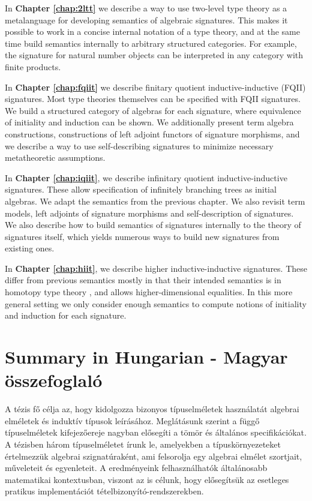 \documentclass[12pt,a4paper,twoside,openany]{book}
\theoremstyle{remark}
\theoremstyle{definition}
\theoremstyle{theorem}
\begin{document}
In \textbf{Chapter \ref{chap:2ltt}} we describe a way to use
two-level type theory \cite{twolevel} as a metalanguage for developing semantics
of algebraic signatures. This makes it possible to work in a concise internal
notation of a type theory, and at the same time build semantics internally to
arbitrary structured categories. For example, the signature for natural number
objects can be interpreted in any category with finite products.

In \textbf{Chapter \ref{chap:fqiit}} we describe finitary quotient
inductive-inductive (FQII) signatures. Most type theories themselves can be
specified with FQII signatures. We build a structured category of algebras for
each signature, where equivalence of initiality and induction can be shown. We
additionally present term algebra constructions, constructions of left adjoint
functors of signature morphisms, and we describe a way to use self-describing
signatures to minimize necessary metatheoretic assumptions.

In \textbf{Chapter \ref{chap:iqiit}}, we describe infinitary quotient
inductive-inductive signatures. These allow specification of infinitely
branching trees as initial algebras. We adapt the semantics from the previous
chapter. We also revisit term models, left adjoints of signature morphisms and
self-description of signatures. We also describe how to build semantics of
signatures internally to the theory of signatures itself, which yields numerous
ways to build new signatures from existing ones.

In \textbf{Chapter \ref{chap:hiit}}, we describe higher inductive-inductive
signatures. These differ from previous semantics mostly in that their intended
semantics is in homotopy type theory \cite{hottbook}, and allows
higher-dimensional equalities. In this more general setting we only consider
enough semantics to compute notions of initiality and induction for each signature.

\pagebreak
\section*{Summary in Hungarian - Magyar összefoglaló}

A tézis fő célja az, hogy kidolgozza bizonyos típuselméletek használatát
algebrai elméletek és induktív típusok leírásához. Meglátásunk szerint a függő
típuselméletek kifejezőereje nagyban elősegíti a tömör és általános
specifikációkat. A tézisben három típuselméletet írunk le, amelyekben a
típuskörnyezeteket értelmezzük algebrai szignatúraként, ami felsorolja egy
algebrai elmélet szortjait, műveleteit és egyenleteit. A eredményeink
felhasználhatók általánosabb matematikai kontextusban, viszont az is célunk,
hogy elősegítsük az esetleges pratikus implementációt
tételbizonyító-rendszerekben.
\end{document}
